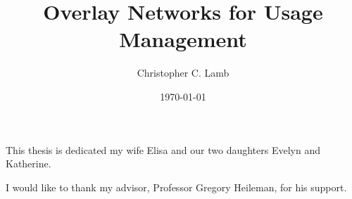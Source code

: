 \documentclass[botnum,fleqn,final]{unmeethesis}
\newcommand{\mytitle}{Overlay Networks for Usage Management}
\newcommand{\myauthor}{Christopher C. Lamb}
\begin{document}
\frontmatter

\title{\mytitle}
\author{\myauthor}





\date{\today}

\maketitle

\makecopyright

\begin{dedication}
   This thesis is dedicated my wife Elisa and our two daughters Evelyn and Katherine.
\end{dedication}

\begin{acknowledgments}
   \vspace{1.1in}
   I would like to thank my advisor, Professor Gregory Heileman, for his support.
\end{acknowledgments}

\maketitleabstract


\end{document}
